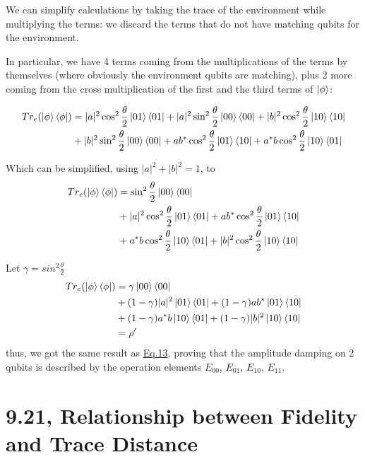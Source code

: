 \documentclass{masterthesis}
\begin{document}
We can simplify calculations by taking the trace of the environment while multiplying the terms: we discard the terms that do not have matching qubits for the environment.

In particular, we have 4 terms coming from the multiplications of the terms by themselves (where obviously the environment qubits are matching), plus 2 more coming from the cross multiplication of the first and the third terms of $\ket{\phi}$:

\begin{align}
    Tr_e(\ket{\phi}\bra{\phi}) &= |a|^2 \cos^2 \frac{\theta}{2}\ket{01}\bra{01} + |a|^2 \sin^2 \frac{\theta}{2}\ket{00}\bra{00} + |b|^2 \cos^2 \frac{\theta}{2}\ket{10}\bra{10} \\
    & + |b|^2 \sin^2 \frac{\theta}{2}\ket{00}\bra{00} + a b^{*} \cos^2 \frac{\theta}{2} \ket{01}\bra{10} + a^{*} b \cos^2 \frac{\theta}{2} \ket{10}\bra{01} 
\end{align}

Which can be simplified, using $|a|^2 + |b|^2 = 1$, to 
\begin{align}
    Tr_e(\ket{\phi}\bra{\phi}) &= \sin^2 \frac{\theta}{2}\ket{00}\bra{00} \\ 
    & + |a|^2 \cos^2 \frac{\theta}{2}\ket{01}\bra{01} + a b^{*} \cos^2 \frac{\theta}{2} \ket{01}\bra{10} \\
    & + a^{*} b \cos^2 \frac{\theta}{2} \ket{10}\bra{01} + |b|^2 \cos^2 \frac{\theta}{2}\ket{10}\bra{10}
\end{align}

Let $\gamma=sin^2\frac{\theta}{2}$
\begin{align}
    Tr_e(\ket{\phi}\bra{\phi}) &= \gamma\ket{00}\bra{00} \\ 
    & + (1-\gamma) |a|^2 \ket{01}\bra{01} + (1-\gamma) a b^{*} \ket{01}\bra{10} \\
    & + (1-\gamma) a^{*} b \ket{10}\bra{01} + (1-\gamma) |b|^2 \ket{10}\bra{10} \\
    &= \rho'
\end{align}
thus, we got the same result as \hyperref[eq:ad-dual-rail]{Eq.13}, proving that the amplitude damping on 2 qubits is described by the operation elements \hyperref[eq:op-el-1]{$E_{00}$}, \hyperref[eq:op-el-2]{$E_{01}$}, \hyperref[eq:op-el-3]{$E_{10}$}, \hyperref[eq:op-el-4]{$E_{11}$}.

\newpage
\section*{9.21, Relationship between Fidelity and Trace Distance}
\end{document}
